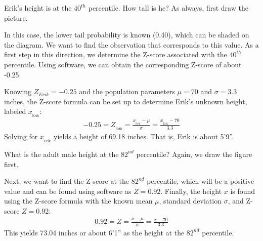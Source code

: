 \begin{examplewrap}
\begin{nexample}{Erik's height is at the $40^{th}$ percentile.
    How tall is he?}\label{normalExam40Perc}
  As always, first draw the picture.\vspace{-4mm}
  \begin{center}
  \vspace{-1mm}
  \end{center}
  In this case, the lower tail probability is known (0.40),
  which can be shaded on the diagram.
  We want to find the observation that corresponds to this value.
  As a first step in this direction, we determine the Z-score
  associated with the $40^{th}$ percentile.
  Using software, we can obtain the corresponding Z-score
  of about -0.25.

  Knowing $Z_{Erik} = -0.25$ and the population parameters
  $\mu = 70$ and $\sigma = 3.3$ inches, the Z-score formula can be
  set up to determine Erik's unknown height, labeled
  $x_{_{\text{Erik}}}$:
  \begin{align*}
  -0.25
    = Z_{_{\text{Erik}}}
    = \frac{x_{_{\text{Erik}}} - \mu}{\sigma}
    = \frac{x_{_{\text{Erik}}} - 70}{3.3}
  \end{align*}
  Solving for $x_{_{\text{Erik}}}$ yields a height of 69.18 inches.
  That is, Erik is about 5'9''.
\end{nexample}
\end{examplewrap}

\begin{examplewrap}
\begin{nexample}{What is the adult male height at the
    $82^{nd}$ percentile?}
  Again, we draw the figure first.\vspace{-3mm}
  \begin{center}
  \vspace{-1mm}
  \end{center}
  Next, we want to find the Z-score at the $82^{nd}$ percentile,
  which will be a positive value and can be found using software
  as $Z = 0.92$.
  Finally, the height $x$ is found using the Z-score formula
  with the known mean $\mu$, standard deviation $\sigma$,
  and Z-score $Z = 0.92$:
  \begin{align*}
  0.92 = Z = \frac{x-\mu}{\sigma} = \frac{x - 70}{3.3}
  \end{align*}
  This yields 73.04 inches or about 6'1'' as the height
  at the $82^{nd}$ percentile.
\end{nexample}
\end{examplewrap}

